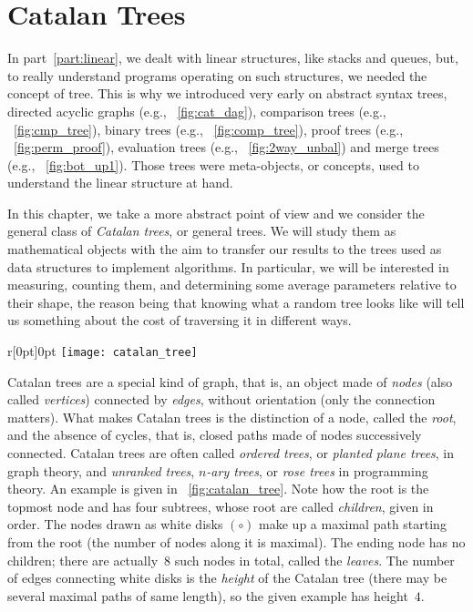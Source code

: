 \chapter{Catalan Trees}
\label{chap:Catalan}

In part~\ref{part:linear}, we dealt with linear structures, like
stacks and queues, but, to really understand programs operating on
such structures, we needed the concept of tree. This is why we
introduced very early on abstract syntax trees, directed acyclic graphs (e.g.,
\fig~\vref{fig:cat_dag}), comparison trees (e.g.,
\fig~\vref{fig:cmp_tree}), binary trees (e.g.,
\fig~\vref{fig:comp_tree}), proof trees (e.g.,
\fig~\vref{fig:perm_proof}), evaluation trees (e.g.,
\fig~\vref{fig:2way_unbal}) and merge trees (e.g.,
\fig~\vref{fig:bot_up1}). Those trees were meta\hyp{}objects, or
concepts, used to understand the linear structure at hand.

In this chapter, we take a more abstract point of view and we consider
the general class of \emph{Catalan trees}, or general trees. We will
study them as mathematical objects with the aim to transfer our
results to the trees used as data structures to implement
algorithms. In particular, we will be interested in measuring,
counting them, and determining some average parameters relative to
their shape, the reason being that knowing what a random tree looks
like will tell us something about the cost of traversing it in
different ways.

%
\begin{wrapfigure}[9]{r}[0pt]{0pt}
\centering
\texttt{[image: catalan\_tree]}
\caption{Catalan tree of height~4}
\label{fig:catalan_tree}
\end{wrapfigure}
Catalan trees are a special kind of graph, that is, an object made of
\emph{nodes} (also called \emph{vertices}) connected by \emph{edges},
without orientation (only the connection matters). What makes Catalan
trees is the distinction of a node, called the \emph{root}, and the
absence of cycles, that is, closed paths made of nodes successively
connected. Catalan trees are often called \emph{ordered trees}, or
\emph{planted plane trees}, in graph theory, and \emph{unranked
trees}, \emph{\(n\)-ary trees}, or \emph{rose trees} in programming
theory. An example is given in \fig~\ref{fig:catalan_tree}. Note how
the root is the topmost node and has four subtrees, whose root are
called \emph{children}, given in order. The nodes drawn as white disks
\((\circ)\) make up a maximal path starting from the root (the number
of nodes along it is maximal). The ending node has no children; there
are actually~\(8\) such nodes in total, called the \emph{leaves}. The
number of edges connecting white disks is the \emph{height} of the
Catalan tree (there may be several maximal paths of same length), so
the given example has height~\(4\).

